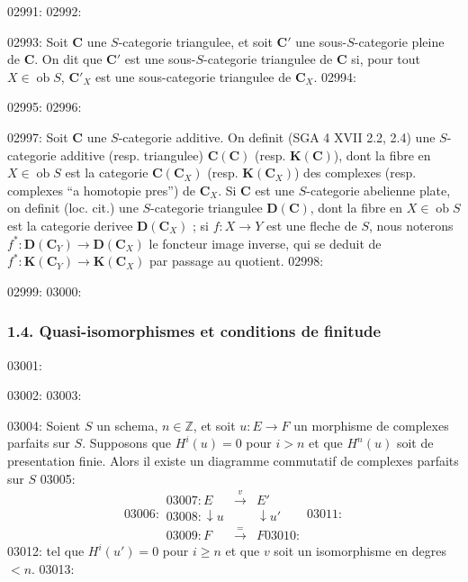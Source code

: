 02991: 
02992: \begin{definition}
02993: Soit $\mathbf{C}$ une $S$-categorie triangulee, et soit $\mathbf{C}'$ une sous-$S$-categorie pleine de $\mathbf{C}$. On dit que $\mathbf{C}'$ est une sous-$S$-categorie triangulee de $\mathbf{C}$ si, pour tout $X \in \operatorname{ob} S$, $\mathbf{C}'_X$ est une sous-categorie triangulee de $\mathbf{C}_X$.
02994: \end{definition}
02995: 
02996: \begin{definition}
02997: Soit $\mathbf{C}$ une $S$-categorie additive. On definit (SGA 4 XVII 2.2, 2.4) une $S$-categorie additive (resp. triangulee) $\mathbf{C}(\mathbf{C})$ (resp. $\mathbf{K}(\mathbf{C})$), dont la fibre en $X \in \operatorname{ob} S$ est la categorie $\mathbf{C}(\mathbf{C}_X)$ (resp. $\mathbf{K}(\mathbf{C}_X)$) des complexes (resp. complexes ``a homotopie pres'') de $\mathbf{C}_X$. Si $\mathbf{C}$ est une $S$-categorie abelienne plate, on definit (loc. cit.) une $S$-categorie triangulee $\mathbf{D}(\mathbf{C})$, dont la fibre en $X \in \operatorname{ob} S$ est la categorie derivee $\mathbf{D}(\mathbf{C}_X)$ ; si $f : X \to Y$ est une fleche de $S$, nous noterons $f^* : \mathbf{D}(\mathbf{C}_Y) \to \mathbf{D}(\mathbf{C}_X)$ le foncteur image inverse, qui se deduit de $f^* : \mathbf{K}(\mathbf{C}_Y) \to \mathbf{K}(\mathbf{C}_X)$ par passage au quotient.
02998: \end{definition}
02999: 
03000: \subsubsection*{1.4. Quasi-isomorphismes et conditions de finitude}
03001: 
03002: 
03003: \begin{lemme}[1.4.1]
03004: Soient $S$ un schema, $n \in \mathbb{Z}$, et soit $u : E \to F$ un morphisme de complexes parfaits sur $S$. Supposons que $H^i(u) = 0$ pour $i > n$ et que $H^n(u)$ soit de presentation finie. Alors il existe un diagramme commutatif de complexes parfaits sur $S$
03005: \[
03006: \begin{array}{ccc}
03007: E & \xrightarrow{v} & E' \\
03008: \downarrow{u} & & \downarrow{u'} \\
03009: F & \xrightarrow{=} & F
03010: \end{array}
03011: \]
03012: tel que $H^i(u') = 0$ pour $i \geq n$ et que $v$ soit un isomorphisme en degres $< n$.
03013: \end{lemme}
